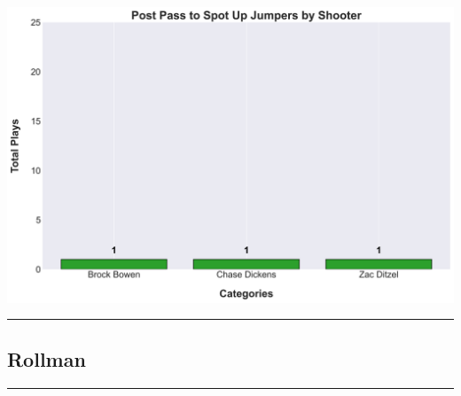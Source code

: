 \documentclass[a4paper,12pt]{article}
\begin{document}
\begin{table}[H]
{\begin{minipage}[t]{0.6\textwidth}
{\begin{tabular}
            \bottomrule
        \end{tabular}
        } %
    \end{minipage}
    } %
    \hfill %
    \begin{minipage}[c]{0.35\textwidth} %
        \flushright
        \includegraphics[width=\textwidth, height=.14\textheight]{images/Post_PassShotsPlayer_Freq.png} %
    \end{minipage}
\end{table}

\vspace{-1em} %
\hrule height 1pt width 1\textwidth %
\vspace{1em} %





\subsection{Rollman}

\vspace{1em} %
\hrule height 1pt width 1\textwidth %
\vspace{1em} %
\end{document}
